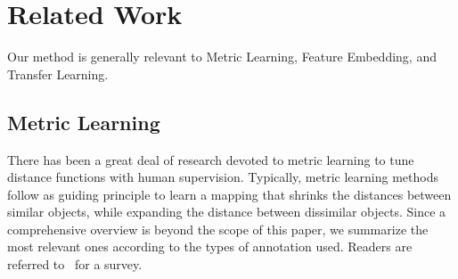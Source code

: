 \documentclass[10pt,twocolumn,letterpaper]{article}
\begin{document}



\section{Related Work}
\label{sec:rel}

Our method is generally relevant to Metric Learning, Feature
Embedding, and Transfer Learning.

\subsection{Metric Learning}
There has been a great deal of research devoted to metric learning
to tune distance functions  with human supervision. %
Typically, metric learning methods 
follow as guiding principle to learn a mapping that shrinks the
distances between similar objects, while expanding the distance between 
dissimilar objects. 
Since a comprehensive overview is beyond the scope of this paper, we
summarize the most relevant ones according to the types of annotation
used. Readers are referred to~\cite{metric:survey:12}
for a survey.
\end{document}
